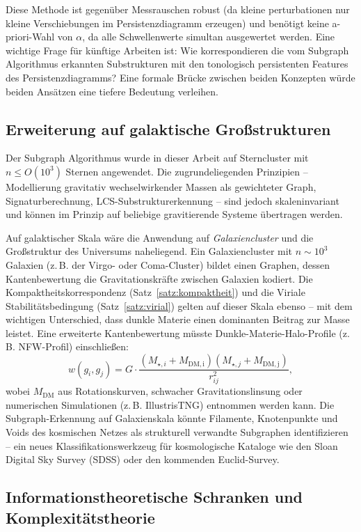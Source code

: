 ﻿\documentclass[a4paper,12pt]{report}
\theoremstyle{definition}
\begin{document}
Diese Methode ist gegenüber Messrauschen robust (da kleine perturbationen nur kleine Verschiebungen im Persistenzdiagramm erzeugen) und benötigt keine a-priori-Wahl von $\alpha$, da alle Schwellenwerte simultan ausgewertet werden. Eine wichtige Frage für künftige Arbeiten ist: Wie korrespondieren die vom Subgraph Algorithmus erkannten Substrukturen mit den tonologisch persistenten Features des Persistenzdiagramms? Eine formale Brücke zwischen beiden Konzepten würde beiden Ansätzen eine tiefere Bedeutung verleihen.

\subsection{Erweiterung auf galaktische Großstrukturen}

Der Subgraph Algorithmus wurde in dieser Arbeit auf Sterncluster mit $n \leq O(10^3)$ Sternen angewendet. Die zugrundeliegenden Prinzipien -- Modellierung gravitativ wechselwirkender Massen als gewichteter Graph, Signaturberechnung, LCS-Substrukturerkennung -- sind jedoch skaleninvariant und können im Prinzip auf beliebige gravitierende Systeme übertragen werden.

Auf galaktischer Skala wäre die Anwendung auf \emph{Galaxiencluster} und die Großstruktur des Universums naheliegend. Ein Galaxiencluster mit $n \sim 10^3$ Galaxien (z.\,B. der Virgo- oder Coma-Cluster) bildet einen Graphen, dessen Kantenbewertung die Gravitationskräfte zwischen Galaxien kodiert. Die Kompaktheitskorrespondenz (Satz~\ref{satz:kompaktheit}) und die Viriale Stabilitätsbedingung (Satz~\ref{satz:virial}) gelten auf dieser Skala ebenso -- mit dem wichtigen Unterschied, dass dunkle Materie einen dominanten Beitrag zur Masse leistet. Eine erweiterte Kantenbewertung müsste Dunkle-Materie-Halo-Profile (z.\,B. NFW-Profil) einschließen:
\[
w(g_i, g_j) = G \cdot \frac{(M_{\star,i} + M_\mathrm{DM,i})(M_{\star,j} + M_\mathrm{DM,j})}{r_{ij}^2},
\]
wobei $M_\mathrm{DM}$ aus Rotationskurven, schwacher Gravitationslinsung oder numerischen Simulationen (z.\,B. IllustrisTNG) entnommen werden kann. Die Subgraph-Erkennung auf Galaxienskala könnte Filamente, Knotenpunkte und Voids des kosmischen Netzes als strukturell verwandte Subgraphen identifizieren -- ein neues Klassifikationswerkzeug für kosmologische Kataloge wie den Sloan Digital Sky Survey (SDSS) oder den kommenden Euclid-Survey.

\subsection{Informationstheoretische Schranken und Komplexitäts\-theorie}
\end{document}
